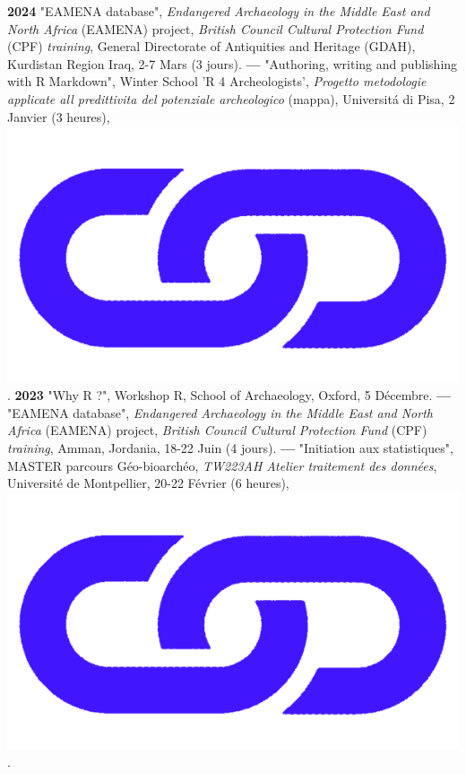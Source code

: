 \documentclass{article}
\begin{document}
\textbf{2024 }"EAMENA database", \textit{Endangered Archaeology in the Middle East and North Africa} (EAMENA) project, \textit{British Council Cultural Protection Fund} (CPF) \textit{training}, General Directorate of Antiquities and Heritage (GDAH), Kurdistan Region Iraq, 2-7 Mars (3 jours).
\smallbreak
\textbf{--- }"Authoring, writing and publishing with R Markdown", Winter School 'R 4 Archeologists', \textit{Progetto metodologie applicate all predittivita del potenziale archeologico} (mappa), Universit\'{a} di Pisa, 2 Janvier (3 heures), \href{https://github.com/zoometh/thomashuet/tree/main/teach/stats/r4a}{\includegraphics[scale=0.02]{link_darkblue.png}}.
\smallbreak
\textbf{2023 }"Why R ?", Workshop R, School of Archaeology, Oxford, 5 Décembre.
\smallbreak
\textbf{--- }"EAMENA database", \textit{Endangered Archaeology in the Middle East and North Africa} (EAMENA) project, \textit{British Council Cultural Protection Fund} (CPF) \textit{training}, Amman, Jordania, 18-22 Juin (4 jours).
\smallbreak
\textbf{--- }"Initiation aux statistiques", MASTER parcours Géo-bioarchéo, \textit{TW223AH Atelier traitement des données}, Universit\'{e} de Montpellier, 20-22 Février (6 heures), \href{http://shinyserver.cfs.unipi.it:3838/teach/stats/upv/_site/#/title-slide}{\includegraphics[scale=0.02]{link_darkblue.png}}.
\end{document}
